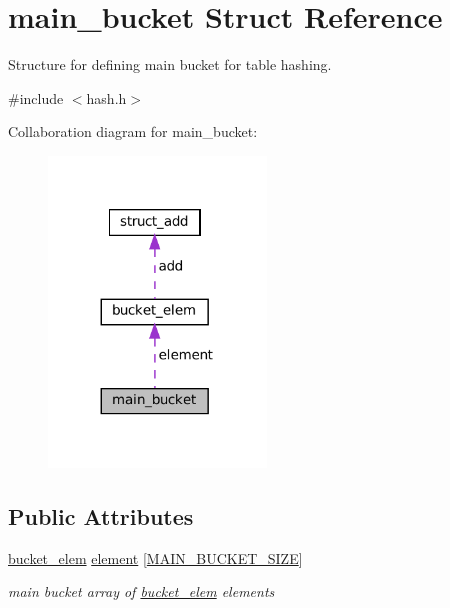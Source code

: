 \hypertarget{structmain__bucket}{}\section{main\+\_\+bucket Struct Reference}
\label{structmain__bucket}


Structure for defining main bucket for table hashing.  




{\ttfamily \#include $<$hash.\+h$>$}



Collaboration diagram for main\+\_\+bucket\+:\nopagebreak
\begin{figure}[H]
\begin{center}
\leavevmode
\includegraphics[width=164pt]{structmain__bucket__coll__graph}
\end{center}
\end{figure}
\subsection*{Public Attributes}
\begin{DoxyCompactItemize}
\item 
\mbox{\label{structmain__bucket_a9b8d4d8df358bb72c94902a6536a44aa}} 
\hyperlink{structbucket__elem}{bucket\+\_\+elem} \hyperlink{structmain__bucket_a9b8d4d8df358bb72c94902a6536a44aa}{element} \mbox{[}\hyperlink{constants_8h_adb850952f74aa7723db8d189eed815c6}{M\+A\+I\+N\+\_\+\+B\+U\+C\+K\+E\+T\+\_\+\+S\+I\+ZE}\mbox{]}
\begin{DoxyCompactList}\small\item\em main bucket array of \hyperlink{structbucket__elem}{bucket\+\_\+elem} elements \end{DoxyCompactList}\end{DoxyCompactItemize}



